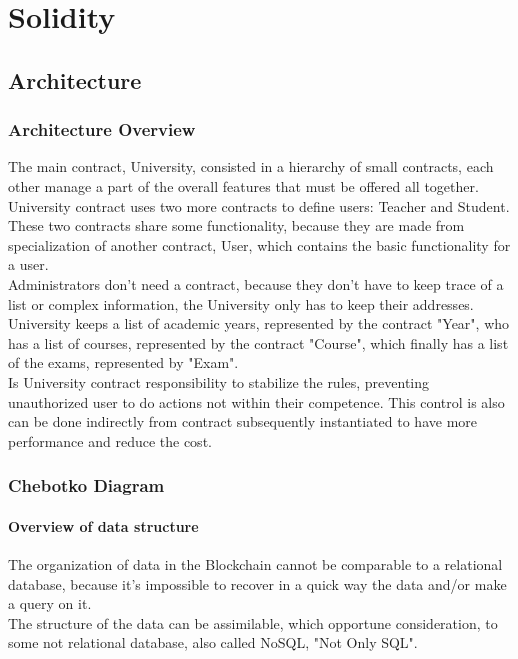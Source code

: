 \documentclass[ManualeSviluppatore.tex]{subfiles}
\begin{document}

\chapter{Solidity}
\section{Architecture}
\subsection{Architecture Overview}
The main contract, University, consisted in a hierarchy of small contracts, each other manage a part of the overall features that must be offered all together.\\
University contract uses two more contracts to define users: Teacher and Student. These two contracts share some functionality, because they are made from specialization of another contract, User, which contains the basic functionality for a user.\\
Administrators don't need a contract, because they don't have to keep trace of a list or complex information, the University only has to keep their addresses.\\
University keeps a list of academic years, represented by the contract "Year", who has a list of courses, represented by the contract "Course", which finally has a list of the exams, represented by "Exam".\\

Is University contract responsibility to stabilize the rules, preventing unauthorized user to do actions not within their competence. This control is also can be done indirectly from contract subsequently instantiated to have more performance and reduce the cost.\\

\subsection{Chebotko Diagram}
\subsubsection{Overview of data structure}
The organization of data in the Blockchain cannot be comparable to a relational database, because it's impossible to recover in a quick way the data and/or make a query on it.\\
The structure of the data can be assimilable, which opportune consideration, to some not relational database, also called NoSQL, "Not Only SQL".\\
\end{document}
